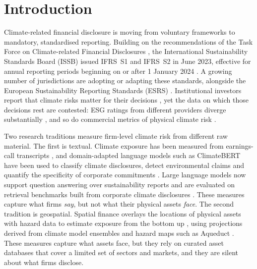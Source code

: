 \documentclass{article}
\theoremstyle{plain}
\theoremstyle{definition}
\begin{document}
\section{Introduction}
\label{sec:intro}

Climate-related financial disclosure is moving from voluntary frameworks to mandatory, standardised reporting. Building on the recommendations of the Task Force on Climate-related Financial Disclosures \citep{tcfd2017}, the International Sustainability Standards Board (ISSB) issued IFRS~S1 and IFRS~S2 in June 2023, effective for annual reporting periods beginning on or after 1 January 2024 \citep{ifrs2023s1,ifrs2023s2}. A growing number of jurisdictions are adopting or adapting these standards, alongside the European Sustainability Reporting Standards (ESRS) \citep{ec2023esrs}. Institutional investors report that climate risks matter for their decisions \citep{krueger2020importance}, yet the data on which those decisions rest are contested: ESG ratings from different providers diverge substantially \citep{berg2022aggregate}, and so do commercial metrics of physical climate risk \citep{hain2022physical}.

Two research traditions measure firm-level climate risk from different raw material. The first is textual. Climate exposure has been measured from earnings-call transcripts \citep{sautner2023firm}, and domain-adapted language models such as ClimateBERT \citep{webersinke2021climatebert} have been used to classify climate disclosures, detect environmental claims and quantify the specificity of corporate commitments \citep{bingler2022cheap,stammbach2023environmental,schimanski2024bridging}. Large language models now support question answering over sustainability reports \citep{ni2023chatreport} and are evaluated on retrieval benchmarks built from corporate climate disclosures \citep{schimanski2024climretrieve}. These measures capture what firms \emph{say}, but not what their physical assets \emph{face}. The second tradition is geospatial. Spatial finance overlays the locations of physical assets with hazard data to estimate exposure from the bottom up \citep{caldecott2022spatial}, using projections derived from climate model ensembles \citep{eyring2016cmip6,thrasher2022nex} and hazard maps such as Aqueduct \citep{ward2020aqueduct,kuzma2023aqueduct}. These measures capture what assets face, but they rely on curated asset databases that cover a limited set of sectors and markets, and they are silent about what firms disclose.
\end{document}
